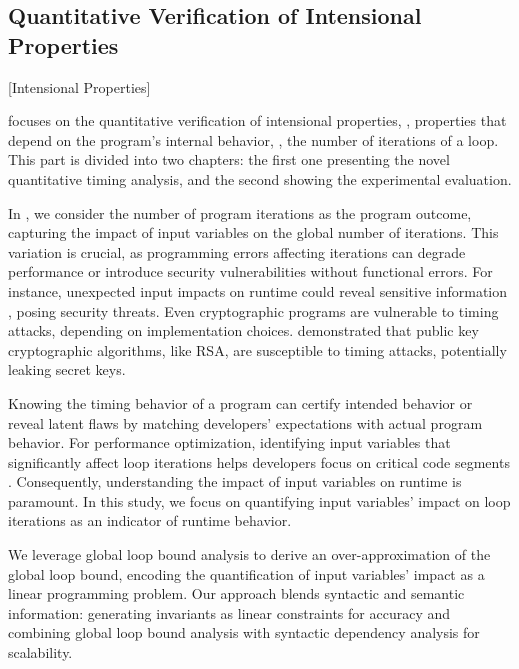 \subsection{Quantitative Verification of Intensional Properties}[Intensional Properties]


 focuses on the quantitative verification of intensional properties, \ie, properties that depend on the program's internal behavior, \eg, the number of iterations of a loop.
This part is divided into two chapters: the first one presenting the novel quantitative timing analysis, and the second showing the experimental evaluation.

In , we consider the number of program iterations as the program outcome, capturing the impact of input variables on the global number of iterations.
This variation is crucial, as programming errors affecting iterations can degrade performance or introduce security vulnerabilities without functional errors.
For instance, unexpected input impacts on runtime could reveal sensitive information , posing security threats.
Even cryptographic programs are vulnerable to timing attacks, depending on implementation choices.
 demonstrated that public key cryptographic algorithms, like RSA, are susceptible to timing attacks, potentially leaking secret keys.

Knowing the timing behavior of a program can certify intended behavior or reveal latent flaws by matching developers' expectations with actual program behavior.
For performance optimization, identifying input variables that significantly affect loop iterations helps developers focus on critical code segments .
Consequently, understanding the impact of input variables on runtime is paramount.
In this study, we focus on quantifying input variables' impact on loop iterations as an indicator of runtime behavior.

We leverage global loop bound analysis to derive an over-approximation of the global loop bound, encoding the quantification of input variables' impact as a linear programming problem.
Our approach blends syntactic and semantic information: generating invariants as linear constraints for accuracy and combining global loop bound analysis with syntactic dependency analysis  for scalability.

